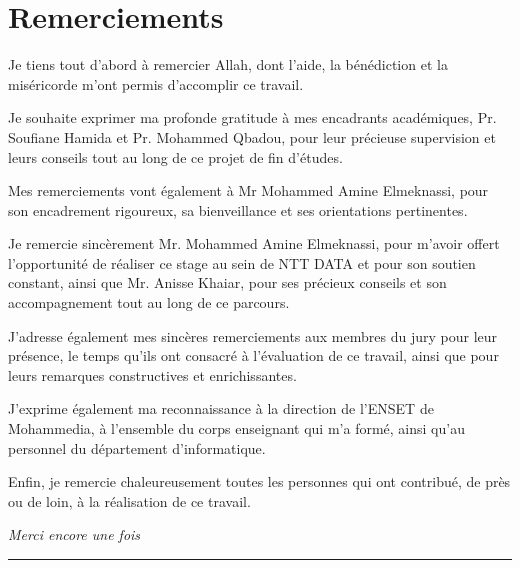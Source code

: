 \chapter*{Remerciements}

Je tiens tout d'abord à remercier Allah, dont l'aide, la bénédiction et la miséricorde m'ont permis d'accomplir ce travail.

Je souhaite exprimer ma profonde gratitude à mes encadrants académiques,
Pr. Soufiane Hamida et Pr. Mohammed Qbadou, pour leur précieuse supervision et leurs conseils tout au long de ce projet de fin d'études.

Mes remerciements vont également à Mr Mohammed Amine Elmeknassi, pour son encadrement rigoureux, sa bienveillance et ses orientations pertinentes.

Je remercie sincèrement Mr. Mohammed Amine Elmeknassi, pour m'avoir offert l'opportunité de réaliser ce stage au sein de NTT DATA et pour son soutien constant, ainsi que Mr. Anisse Khaiar, pour ses précieux conseils et son accompagnement tout au long de ce parcours.

J'adresse également mes sincères remerciements aux membres du jury pour leur présence, le temps qu'ils ont consacré à l'évaluation de ce travail, ainsi que pour leurs remarques constructives et enrichissantes.

J'exprime également ma reconnaissance à la direction de l'ENSET de Mohammedia, à l'ensemble du corps enseignant qui m'a formé, ainsi qu'au personnel du département d'informatique.

Enfin, je remercie chaleureusement toutes les personnes qui ont contribué, de près ou de loin, à la réalisation de ce travail.

\vspace{1em}
\begin{flushright}
	\textit{Merci encore une fois}\\
	\vspace{0.3cm}
	\rule{4cm}{0.5pt}
\end{flushright}